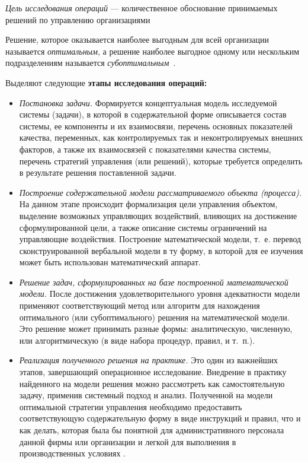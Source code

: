 \textsl{Цель исследования операций} --- количественное обоснование принимаемых
решений по управлению организациями

Решение, которое оказывается наиболее выгодным для всей организации
называется \textsl{оптимальным}, а решение наиболее выгодное одному или
нескольким подразделениям называется \textsl{субоптимальным}~\cite{operResearch}.

Выделяют следующие \textbf{этапы исследования операций:}

\begin{itemize}

\item \textsl{Постановка задачи.}
  Формируется концептуальная модель исследуемой
  системы (задачи), в которой в содержательной форме описывается состав
  системы, ее компоненты и их взаимосвязи, перечень основных показателей
  качества, переменных, как контролируемых так и неконтролируемых
  внешних факторов, а также их взаимосвязей с показателями качества
  системы, перечень стратегий управления (или решений), которые требуется
  определить в результате решения поставленной задачи.

\item \textsl{Построение содержательной модели рассматриваемого объекта
    (процесса).}
  На данном этапе происходит формализация цели управления
  объектом, выделение возможных управляющих воздействий, влияющих на
  достижение сформулированной цели, а также описание системы ограничений
  на управляющие воздействия. Построение математической модели,
  т.~е. перевод сконструированной вербальной модели в ту форму, в
  которой для ее изучения может быть использован математический аппарат.

\item \textsl{Решение задач, сформулированных на базе построенной математической модели.}
  После достижения удовлетворительного уровня адекватности
  модели применяют соответствующий метод или алгоритм для нахождения
  оптимального (или субоптимального) решения на математической
  модели. Это решение может принимать разные формы: аналитическую,
  численную, или алгоритмическую (в виде набора процедур, правил, и
  т.~п.).

\item \textsl{Реализация полученного решения на практике.}
  Это один из важнейших этапов, завершающий операционное исследование. Внедрение в практику найденного на модели решения можно рассмотреть как
  самостоятельную задачу, применив системный подход и анализ. Полученной
  на модели оптимальной стратегии управления необходимо предоставить
  соответствующую содержательную форму в виде инструкций и правил, что и
  как делать, которая была бы понятной для административного персонала
  данной фирмы или организации и легкой для выполнения в
  производственных условиях \cite{psati}.

\end{itemize}

